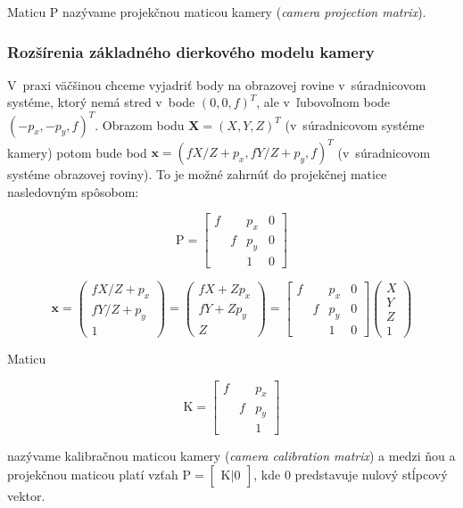Maticu $\mathrm{P}$ nazývame projekčnou maticou kamery (\emph{camera projection matrix}).

\subsubsection{Rozšírenia základného dierkového modelu kamery}

V~praxi väčšinou chceme vyjadriť body na obrazovej rovine v~súradnicovom systéme, ktorý nemá stred v~bode $(0, 0, f)^T$, ale v~ľubovoľnom bode $(-p_x, -p_y, f)^T$. Obrazom bodu $\mathbf{X} = (X, Y, Z)^T$ (v~súradnicovom systéme kamery) potom bude bod $\mathbf{x} = (fX/Z + p_x, fY/Z + p_y, f)^T$ (v~súradnicovom systéme obrazovej roviny). To je možné zahrnúť do projekčnej matice nasledovným spôsobom:

$$ \mathrm{P} =
\begin{bmatrix}
f &   & p_x & 0 \\
  & f & p_y & 0 \\
  &   &  1  & 0
\end{bmatrix}
$$

$$ \mathbf{x} 
=
\begin{pmatrix}
fX/Z + p_x \\
fY/Z + p_y \\
1
\end{pmatrix}
=
\begin{pmatrix}
fX + Z p_x \\
fY + Z p_y \\
Z
\end{pmatrix}
=
\begin{bmatrix}
f &   &  p_x & 0 \\
  & f &  p_y & 0 \\
  &   &   1  & 0
\end{bmatrix}
\begin{pmatrix}
X \\
Y \\
Z \\
1
\end{pmatrix}
$$

Maticu

$$ \mathrm{K} 
=
\begin{bmatrix}
f &   &  p_x \\
  & f &  p_y \\
  &   &   1  
\end{bmatrix}
$$

nazývame kalibračnou maticou kamery (\emph{camera calibration matrix}) a medzi ňou a projekčnou maticou platí vzťah
$\mathrm{P} = \begin{bmatrix} \mathrm{K} | 0 \end{bmatrix}$, kde $0$ predstavuje nulový stĺpcový vektor.

